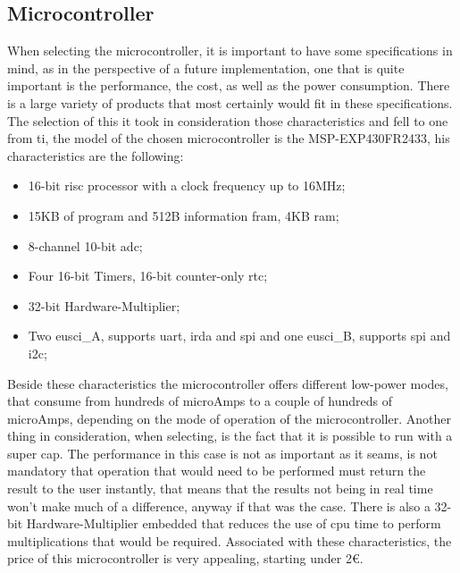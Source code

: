 \subsection{Microcontroller}
When selecting the microcontroller, it is important to have some specifications in mind, as in the perspective of a future implementation, one that is quite important is the performance, the cost, as well as the power consumption. There is a large variety of products that most certainly would fit in these specifications. The selection of this it took in consideration those characteristics and fell to one from \acrlong{ti}, the model of the chosen microcontroller is the MSP-EXP430FR2433, his characteristics are the following:
\begin{itemize}
    \item 16-bit \acrshort{risc} processor with a clock frequency up to 16MHz;
    \item 15KB of program and 512B information \acrshort{fram}, 4KB \acrshort{ram};
    \item 8-channel 10-bit \acrshort{adc};
    \item Four 16-bit Timers, 16-bit counter-only \acrshort{rtc};
    \item 32-bit Hardware-Multiplier;
    \item Two \acrshort{eusci}\_A, supports \acrshort{uart}, \acrshort{irda} and \acrshort{spi} and one \acrshort{eusci}\_B, supports \acrshort{spi} and \acrshort{i2c};
\end{itemize}
Beside these characteristics the microcontroller offers different low-power modes, that consume from hundreds of microAmps to a couple of hundreds of microAmps, depending on the mode of operation of the microcontroller. Another thing in consideration, when selecting, is the fact that it is possible to run with a super cap. The performance in this case is not as important as it seams, is not mandatory that operation that would need to be performed must return the result to the user instantly, that means that the results not being in real time won't make much of a difference, anyway if that was the case. There is also a 32-bit Hardware-Multiplier embedded that reduces the use of \acrshort{cpu} time to perform multiplications that would be required\cite{MSP430FR2433DataSheet}. Associated with these characteristics, the price of this microcontroller is very appealing, starting under 2€.

